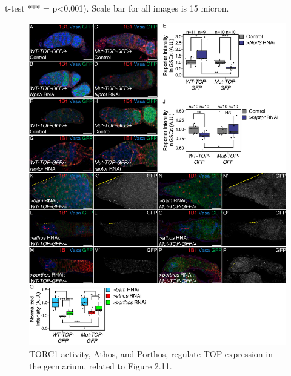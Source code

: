 \documentclass[12pt,oneside]{reedthesis}
\begin{document}
t-test *** = p\textless0.001). Scale bar for all images is 15 micron.
\begin{figure}

{\centering \includegraphics[width=6.5 in,height=8.9375 in]{./figure/Ribosome Biogenesis/Ribosome Biogenesis 6S} 

}

\caption[TORC1 activity, Athos, and Porthos, regulate TOP expression in the germarium, related to Figure 2.11.]{TORC1 activity, Athos, and Porthos, regulate TOP expression in the germarium, related to Figure 2.11.}\label{fig:unnamed-chunk-17}
\end{figure}
\textbf{\hfill\break
}
\end{document}
